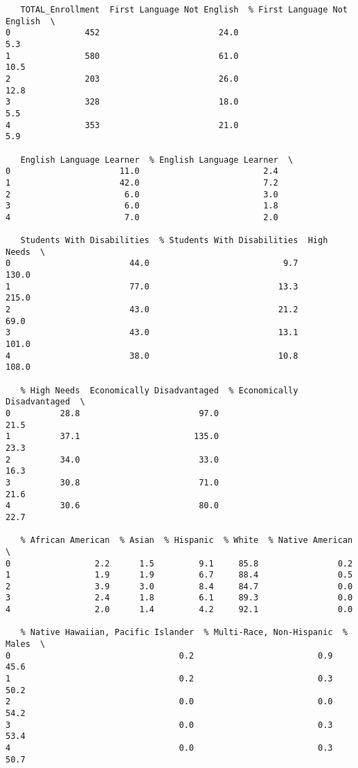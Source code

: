 \documentclass[11pt]{article}
\begin{document}
\begin{verbatim}
   TOTAL_Enrollment  First Language Not English  % First Language Not English  \
0               452                        24.0                           5.3   
1               580                        61.0                          10.5   
2               203                        26.0                          12.8   
3               328                        18.0                           5.5   
4               353                        21.0                           5.9   

   English Language Learner  % English Language Learner  \
0                      11.0                         2.4   
1                      42.0                         7.2   
2                       6.0                         3.0   
3                       6.0                         1.8   
4                       7.0                         2.0   

   Students With Disabilities  % Students With Disabilities  High Needs  \
0                        44.0                           9.7       130.0   
1                        77.0                          13.3       215.0   
2                        43.0                          21.2        69.0   
3                        43.0                          13.1       101.0   
4                        38.0                          10.8       108.0   

   % High Needs  Economically Disadvantaged  % Economically Disadvantaged  \
0          28.8                        97.0                          21.5   
1          37.1                       135.0                          23.3   
2          34.0                        33.0                          16.3   
3          30.8                        71.0                          21.6   
4          30.6                        80.0                          22.7   

   % African American  % Asian  % Hispanic  % White  % Native American  \
0                 2.2      1.5         9.1     85.8                0.2   
1                 1.9      1.9         6.7     88.4                0.5   
2                 3.9      3.0         8.4     84.7                0.0   
3                 2.4      1.8         6.1     89.3                0.0   
4                 2.0      1.4         4.2     92.1                0.0   

   % Native Hawaiian, Pacific Islander  % Multi-Race, Non-Hispanic  % Males  \
0                                  0.2                         0.9     45.6   
1                                  0.2                         0.3     50.2   
2                                  0.0                         0.0     54.2   
3                                  0.0                         0.3     53.4   
4                                  0.0                         0.3     50.7   


\end{verbatim}
\end{document}
